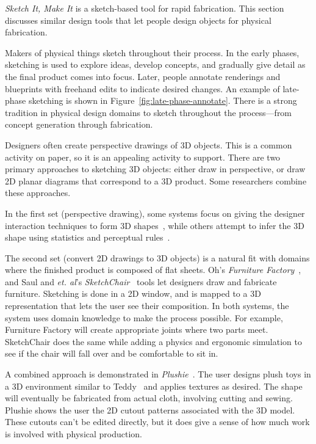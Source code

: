\textit{Sketch It, Make It} is a sketch-based tool for rapid
fabrication. This section discusses similar design tools that let
people design objects for physical fabrication. 

Makers of physical things sketch throughout their process. In the
early phases, sketching is used to explore ideas, develop concepts,
and gradually give detail as the final product comes into
focus. Later, people annotate renderings and blueprints with freehand
edits to indicate desired changes. An example of late-phase sketching
is shown in Figure~\ref{fig:late-phase-annotate}. There is a strong
tradition in physical design domains to sketch throughout the
process---from concept generation through fabrication.



Designers often create perspective drawings of 3D objects. This is a
common activity on paper, so it is an appealing activity to
support. There are two primary approaches to sketching 3D objects:
either draw in perspective, or draw 2D planar diagrams that correspond
to a 3D product. Some researchers combine these approaches.

In the first set (perspective drawing), some systems focus on giving
the designer interaction techniques to form 3D
shapes~\cite{kara-3d-styling,bloomenthal-sketch-n-make}, while others
attempt to infer the 3D shape using statistics and perceptual
rules~\cite{lipson-correlation}. 

The second set (convert 2D drawings to 3D objects) is a natural fit
with domains where the finished product is composed of flat
sheets. Oh's \textit{Furniture Factory}~\cite{oh-fab}, and Saul and
\textit{et. al}'s \textit{SketchChair}~\cite{saul-sketch-chair} tools
let designers draw and fabricate furniture. Sketching is done in a 2D
window, and is mapped to a 3D representation that lets the user see
their composition. In both systems, the system uses domain knowledge
to make the process possible. For example, Furniture Factory will
create appropriate joints where two parts meet. SketchChair does the
same while adding a physics and ergonomic simulation to see if the
chair will fall over and be comfortable to sit in.

A combined approach is demonstrated in
\textit{Plushie}~\cite{mori-plushie}. The user designs plush toys in a
3D environment similar to Teddy~\cite{igarashi-teddy} and applies
textures as desired. The shape will eventually be fabricated from
actual cloth, involving cutting and sewing. Plushie shows the user the
2D cutout patterns associated with the 3D model. These cutouts can't
be edited directly, but it does give a sense of how much work is
involved with physical production.

